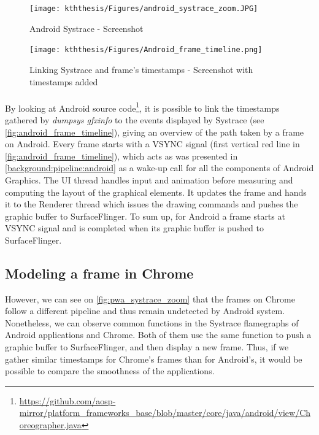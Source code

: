 \documentclass{kththesis}
\begin{document}
    \begin{figure}
        \centering
        \texttt{[image: kththesis/Figures/android\_systrace\_zoom.JPG]}
        \caption{Android Systrace - Screenshot}
        \label{fig:android_systrace_zoom}
    \end{figure}
    
    \begin{figure}[!ht]
        \centering
        \texttt{[image: kththesis/Figures/Android\_frame\_timeline.png]}
        \caption{Linking Systrace and frame's timestamps - Screenshot with timestamps added}
        \label{fig:android_frame_timeline}
    \end{figure}
    
    \paragraph{}
    By looking at Android source code\footnote{\url{https://github.com/aosp-mirror/platform_frameworks_base/blob/master/core/java/android/view/Choreographer.java}}, it is possible to link the timestamps gathered by \textit{dumpsys gfxinfo} to the events displayed by Systrace (see \autoref{fig:android_frame_timeline}), giving an overview of the path taken by a frame on Android. \newline
    \indent Every frame starts with a VSYNC signal (first vertical red line in \autoref{fig:android_frame_timeline}), which acts as was presented in \autoref{background:pipeline:android} as a wake-up call for all the components of Android Graphics. The UI thread handles input and animation before measuring and computing the layout of the graphical elements. It updates the frame and hands it to the Renderer thread which issues the drawing commands and pushes the graphic buffer to SurfaceFlinger. To sum up, for Android a frame starts at VSYNC signal and is completed when its graphic buffer is pushed to SurfaceFlinger.
    
    
    \subsection{Modeling a frame in Chrome}
    
    However, we can see on \autoref{fig:pwa_systrace_zoom} that the frames on Chrome follow a different pipeline and thus remain undetected by Android system. Nonetheless, we can observe common functions in the Systrace flamegraphs of Android applications and Chrome. Both of them use the same function to push a graphic buffer to SurfaceFlinger, and then display a new frame. Thus, if we gather similar timestamps for Chrome's frames than for Android's, it would be possible to compare the smoothness of the applications.
    
\end{document}
